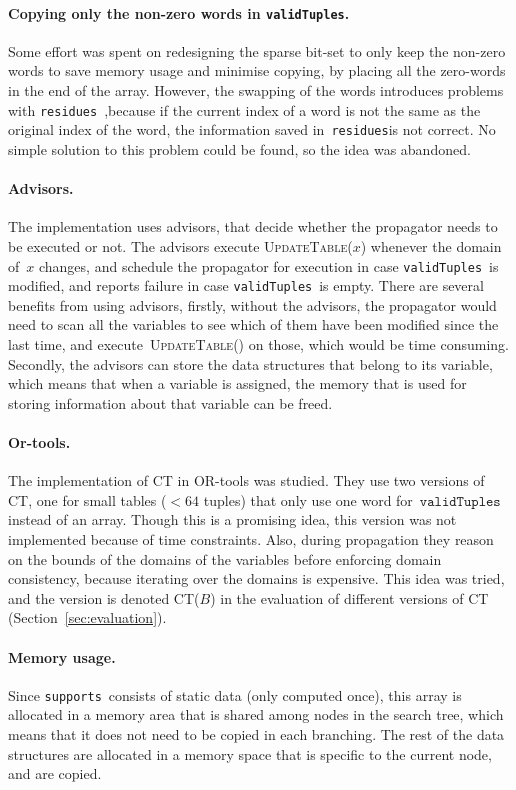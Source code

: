 \documentclass[a4paper,11pt]{article}
\newcommand{\Secref}[1]{Section~\ref{#1}}
\newcommand{\CurrTable}{\texttt{validTuples}}
\newcommand{\Supports}{\texttt{supports}}
\newcommand{\Residues}{\texttt{residues}}
\def\UpdateTable{\textsc{UpdateTable}}
\numberwithin{equation}{section}
\begin{document}
\paragraph{Copying only the non-zero words in \CurrTable.}
Some effort was spent on redesigning the sparse bit-set to only keep the
non-zero words to save memory usage and minimise copying, by placing
all the zero-words in the end of the array. However, the swapping of
the words introduces problems with \Residues~,because if the current
index of a word is not the same as the original index of the word, the
information saved in~\Residues is not correct. No simple solution to
this problem could be found, so the idea was abandoned.

\paragraph{Advisors.} The implementation uses advisors, that decide whether
the propagator needs to be executed or not. The advisors execute \UpdateTable($x$)
whenever the domain of~$x$ changes, and schedule the propagator for execution
in case \CurrTable~is modified, and reports failure in case \CurrTable~is empty.
There are several benefits from using advisors, firstly, without the advisors,
the propagator would need
to scan all the variables to see which of them have been modified since the last
time, and execute~\UpdateTable() on those, which would be time consuming.
Secondly, the advisors can store the data structures that belong to its variable,
which means that when a variable is assigned, the memory that is used for storing
information about that variable can be freed.

\paragraph{Or-tools.} The implementation of CT in OR-tools was studied.
They use two versions of CT, one for small tables ($< 64$ tuples) that
only use one word for~$\CurrTable$ instead of an array. Though this is a
promising idea, this version was not implemented because of time constraints.
Also, during propagation they reason on the bounds of the domains of the variables
before enforcing domain consistency, because iterating over the domains is
expensive. This idea was tried, and the version is denoted CT($B$) in the
evaluation of different versions of CT (\Secref{sec:evaluation}).

\paragraph{Memory usage.} Since \Supports~consists of static data (only
computed once), this array is allocated in a memory area that is shared
among nodes in the search tree, which means that it does not need to be
copied in each branching. The rest of the data structures are allocated
in a memory space that is specific to the current node, and are copied.
\end{document}
